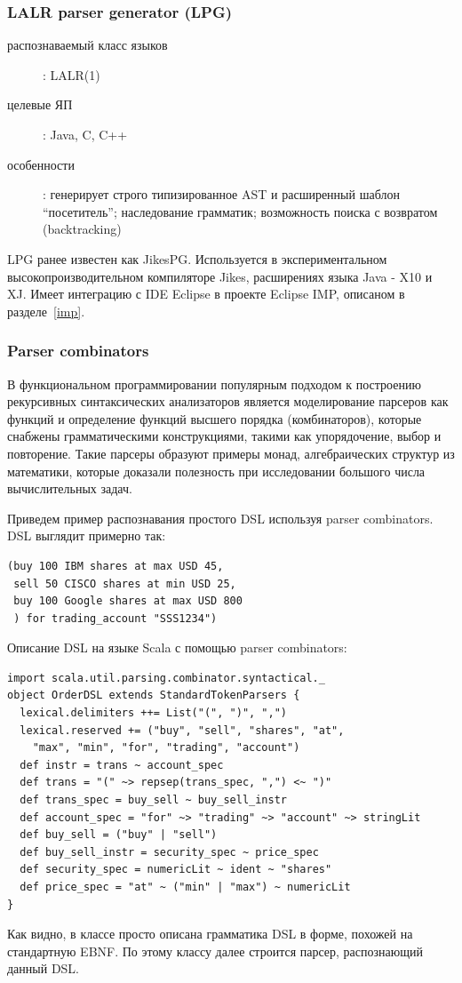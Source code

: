 \documentclass[a4paper,12pt]{article}
\begin{document}
\subsubsection*{LALR parser generator (LPG)}
\begin{description}
  \item[распознаваемый класс языков]: LALR(1)
  \item[целевые ЯП]: Java, C, C++
  \item[особенности]: генерирует строго типизированное AST и расширенный
 	шаблон ``посетитель''; наследование грамматик; возможность поиска с возвратом
 	(backtracking)
\end{description}

LPG ранее известен как JikesPG. Используется в экспериментальном
высокопроизводительном компиляторе Jikes, расширениях языка Java - X10 и XJ.
Имеет интеграцию с IDE Eclipse в проекте Eclipse IMP, описаном в разделе~\ref{imp}.

\subsubsection*{Parser combinators}
В функциональном программировании популярным подходом к построению рекурсивных
синтаксических анализаторов является моделирование парсеров как функций и
определение функций высшего порядка (комбинаторов), которые снабжены
грамматическими конструкциями, такими как упорядочение, выбор и повторение.
Такие парсеры образуют примеры монад, алгебраических структур из математики,
которые доказали полезность при исследовании большого числа вычислительных
задач.

Приведем пример распознавания простого DSL используя parser combinators.
DSL выглядит примерно так:
\begin{verbatim} 
(buy 100 IBM shares at max USD 45,
 sell 50 CISCO shares at min USD 25,
 buy 100 Google shares at max USD 800
 ) for trading_account "SSS1234")
\end{verbatim}
Описание DSL на языке Scala с помощью parser combinators:
\begin{verbatim} 
import scala.util.parsing.combinator.syntactical._
object OrderDSL extends StandardTokenParsers {
  lexical.delimiters ++= List("(", ")", ",")
  lexical.reserved += ("buy", "sell", "shares", "at", 
    "max", "min", "for", "trading", "account")
  def instr = trans ~ account_spec
  def trans = "(" ~> repsep(trans_spec, ",") <~ ")"
  def trans_spec = buy_sell ~ buy_sell_instr
  def account_spec = "for" ~> "trading" ~> "account" ~> stringLit
  def buy_sell = ("buy" | "sell")
  def buy_sell_instr = security_spec ~ price_spec
  def security_spec = numericLit ~ ident ~ "shares"
  def price_spec = "at" ~ ("min" | "max") ~ numericLit
}
\end{verbatim}
Как видно, в классе просто описана грамматика DSL в форме, похожей на
стандартную EBNF. По этому классу далее строится парсер, распознающий данный
DSL.
\end{document}
